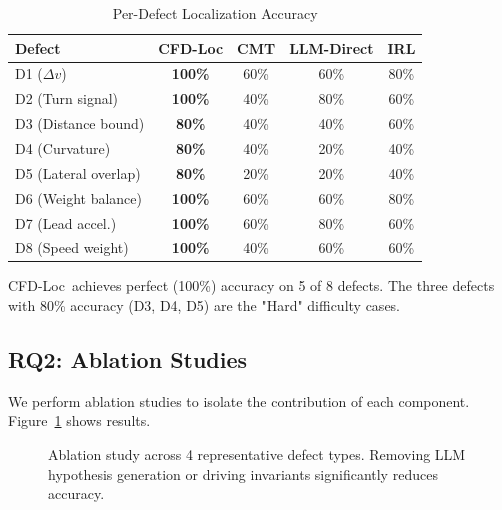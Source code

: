 \documentclass[conference]{IEEEtran}
\theoremstyle{plain}
\newcommand{\methodname}{CFD-Loc}
\begin{document}
\begin{table}[h]
\centering
\caption{Per-Defect Localization Accuracy}
\label{tab:per_defect}
\begin{tabular}{lcccc}
\toprule
\textbf{Defect} & \textbf{\methodname} & \textbf{CMT} & \textbf{LLM-Direct} & \textbf{IRL} \\
\midrule
D1 ($\Delta v$) & \textbf{100\%} & 60\% & 60\% & 80\% \\
D2 (Turn signal) & \textbf{100\%} & 40\% & 80\% & 60\% \\
D3 (Distance bound) & \textbf{80\%} & 40\% & 40\% & 60\% \\
D4 (Curvature) & \textbf{80\%} & 40\% & 20\% & 40\% \\
D5 (Lateral overlap) & \textbf{80\%} & 20\% & 20\% & 40\% \\
D6 (Weight balance) & \textbf{100\%} & 60\% & 60\% & 80\% \\
D7 (Lead accel.) & \textbf{100\%} & 60\% & 80\% & 60\% \\
D8 (Speed weight) & \textbf{100\%} & 40\% & 60\% & 60\% \\
\bottomrule
\end{tabular}
\end{table}

\methodname\ achieves perfect (100\%) accuracy on 5 of 8 defects. The three defects with 80\% accuracy (D3, D4, D5) are the "Hard" difficulty cases.

\subsection{RQ2: Ablation Studies}

We perform ablation studies to isolate the contribution of each component. Figure~\ref{fig:ablation} shows results.

\begin{figure}[h]
    \centering
    \caption{Ablation study across 4 representative defect types. Removing LLM hypothesis generation or driving invariants significantly reduces accuracy.}
    \label{fig:ablation}
\end{figure}
\end{document}
